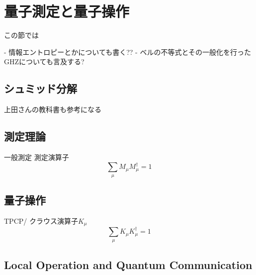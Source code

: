 \chapter{量子測定と量子操作}
\hypertarget{appendixE}{この節では}


- 情報エントロピーとかについても書く??
- ベルの不等式とその一般化を行ったGHZについても言及する?

\section{シュミッド分解}
上田さんの教科書も参考になる
\section{測定理論}
一般測定
測定演算子
\begin{equation}
  \sum_{\mu}M_{\mu}M_{\mu}^{\dagger}=1
\end{equation}

\section{量子操作}
TPCP/
クラウス演算子$K_{\mu}$
\begin{equation}
  \sum_{\mu}K_{\mu}K_{\mu}^{\dagger}=1
\end{equation}

\section{Local Operation and Quantum Communication}

